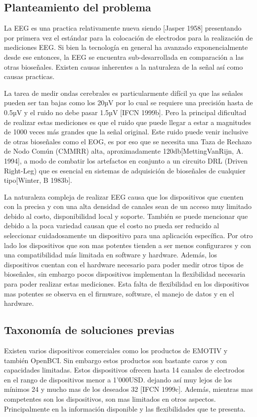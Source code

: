 \subsection{Planteamiento del problema}
\label{sec:orgde4aeaa}
La EEG es una practica relativamente nueva siendo [Jasper 1958]  presentando por primera vez el estándar para la colocación de electrodos para la realización de mediciones EEG. Si bien la tecnología en general ha avanzado exponencialmente desde ese entonces, la EEG se encuentra sub-desarrollada en comparación a las otras bioseñales. Existen causas inherentes a la naturaleza de la señal así como causas practicas. 

La tarea de medir ondas cerebrales es particularmente difícil ya que las señales pueden ser tan bajas como los 20µV por lo cual se requiere una precisión hasta de 0.5µV y el ruido no debe pasar 1.5µV [IFCN 1999b]. Pero la principal dificultad de realizar estas mediciones es que el ruido que puede llegar a estar a magnitudes de 1000 veces más grandes que la señal original. Este ruido puede venir inclusive de otras bioseñales como el EOG, es por eso que se necesita una Taza de Rechazo de Nodo Común (CMMRR) alta, aproximadamente 120db[MettingVanRijn, A. 1994], a modo de combatir los artefactos en conjunto a un circuito DRL (Driven Right-Leg) que es esencial en sistemas de adquisición de bioseñales de cualquier tipo[Winter, B 1983b].

La naturaleza compleja de realizar EEG causa que los dispositivos que cuenten con la  precisa y con una alta densidad de canales sean de un acceso muy limitado debido al costo, disponibilidad local y soporte. También se puede mencionar que debido a la poca variedad causan que el costo no pueda ser reducido al seleccionar cuidadosamente un dispositivo para una aplicación específica. Por otro lado los dispositivos que son mas potentes tienden a ser menos configurares y con una compatibilidad más limitada en software y hardware. Además, los dispositivos cuentan con el hardware necesario para poder medir otros tipos de bioseñales, sin embargo pocos dispositivos implementan la flexibilidad necesaria para poder realizar estas mediciones. Esta falta de flexibilidad en los dispositivos mas potentes se observa en el firmware, software, el manejo de datos y en el hardware.

\subsection{Taxonomía de soluciones previas}
\label{sec:orgd686578}
Existen varios dispositivos comerciales como los productos de EMOTIV y también OpenBCI. Sin embargo estos productos son bastante caros y con capacidades limitadas. Estos dispositivos ofrecen hasta 14 canales de electrodos en el rango de dispositivos menor a 1’000USD. dejando así muy lejos de los mínimos 24 y mucho mas de los deseados 32 [IFCN 1999c]. Además, mientras mas competentes son los dispositivos, son mas limitados en otros aspectos. Principalmente en la información disponible y las flexibilidades que te presenta.

